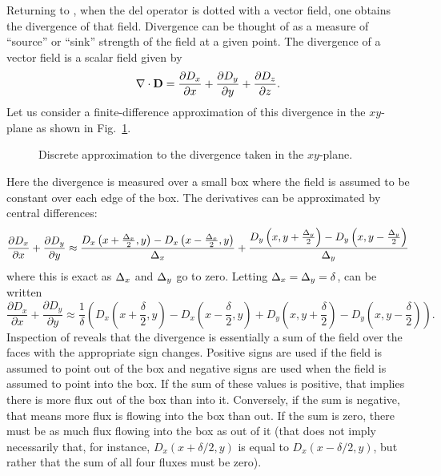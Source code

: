 Returning to , when the del operator is dotted with a
vector field, one obtains the divergence of that field.  Divergence
can be thought of as a measure of ``source'' or ``sink'' strength of the
field at a given point.  The divergence of a vector field is a scalar
field given by
\begin{equation}
 \nabla \cdot \mathbf{D} = \frac{\partial D_x}{\partial x} +
     \frac{\partial D_y}{\partial y} +
     \frac{\partial D_z}{\partial z}.
\end{equation}
Let us consider a finite-difference approximation of this divergence
in the $xy$-plane as shown in Fig.\ \ref{fig:div}.
\begin{figure}
  \begin{center}
  \end{center}
  \caption{Discrete approximation to the divergence taken in the
  $xy$-plane. \label{fig:div}}  
\end{figure}
Here the divergence is measured over a small box where the field is
assumed to be constant over each edge of the box.  The derivatives can
be approximated by central differences:
\begin{equation}
  \frac{\partial D_x}{\partial x} +
  \frac{\partial D_y}{\partial y} \approx 
  \frac{D_x\left(x+\frac{\Delta_x}{2},y\right)
       -D_x\left(x-\frac{\Delta_x}{2},y\right)}{\Delta_x} +
  \frac{D_y\left(x,y+\frac{\Delta_y}{2}\right)
       -D_y\left(x,y-\frac{\Delta_y}{2}\right)}{\Delta_y}
  \label{eq:divII}
\end{equation}
where this is exact as $\Delta_x$ and $\Delta_y$ go to zero.
Letting $\Delta_x=\Delta_y=\delta$,  can be written
\begin{equation}
  \frac{\partial D_x}{\partial x} +
  \frac{\partial D_y}{\partial y} \approx 
  \frac{1}{\delta}
  \left(D_x\left(x+\frac{\delta}{2},y\right) -
        D_x\left(x-\frac{\delta}{2},y\right) +
        D_y\left(x,y+\frac{\delta}{2}\right) -
        D_y\left(x,y-\frac{\delta}{2}\right)\right).
  \label{eq:divIII}
\end{equation}
Inspection of  reveals that the divergence is
essentially a sum of the field over the faces with the appropriate
sign changes.  Positive signs are used if the field is assumed to
point out of the box and negative signs are used when the field is
assumed to point into the box.  If the sum of these values is
positive, that implies there is more flux out of the box than into it.
Conversely, if the sum is negative, that means more flux is flowing
into the box than out.  If the sum is zero, there must be as much flux
flowing into the box as out of it (that does not imply necessarily that,
for instance, $D_x\left(x+\delta/2,y\right)$ is equal to
$D_x\left(x-\delta/2,y\right)$, but rather that the sum of all four
fluxes must be zero).

